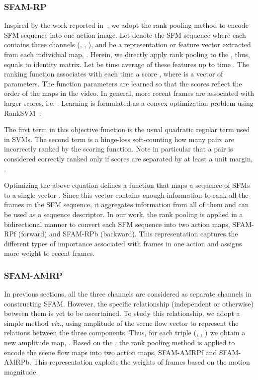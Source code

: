 \documentclass[10pt,twocolumn,letterpaper]{article}
\begin{document}
\subsubsection{SFAM-RP}
Inspired by the work reported in~\cite{bilen2016dynamic}, we adopt the rank 
pooling method to encode SFM sequence into one action image. Let 
 denote the SFM sequence where each  contains three 
channels (, , ), and  be a representation or feature vector extracted from each 
individual map, . Herein, we directly apply rank pooling to the , 
thus,  equals to identity matrix.  Let  be time average of these 
features up to time . The ranking function associates with each time  a 
score , where  is a vector of parameters. The function parameters  
are learned so that the scores reflect the order of the maps in the video. In 
general, more recent frames are associated with larger scores, i.e. . Learning  is 
formulated as a convex optimization problem using 
RankSVM~\cite{smola2004tutorial}:



The first term in this objective function is the usual quadratic regular term 
used in SVMs. 
The second term is a hinge-loss soft-counting how many pairs  are 
incorrectly ranked by the scoring function. Note in particular that a pair is 
considered correctly ranked only if scores are separated by at least a unit 
margin, . 

Optimizing the above equation defines a function  
that maps a sequence of  SFMs to a single vector . Since 
this vector contains enough information to rank all the frames in the SFM 
sequence, it aggregates information from all of them and can be used as a 
sequence descriptor.  In our work, the rank pooling is applied in a bidirectional 
manner to convert each SFM sequence into two action maps, SFAM-RPf (forward) 
and SFAM-RPb (backward). This representation captures the different 
types of importance associated with frames in one action and assigns more 
weight to recent frames. 

\subsubsection{SFAM-AMRP}

In previous sections, all the three channels are considered as separate 
channels in constructing SFAM. However, the specific relationship (independent 
or otherwise) between them is yet to be ascertained. To study this 
relationship, we adopt a simple method \textit{viz.}, using amplitude of the 
scene flow vector  to represent the relations between the three 
components. Thus, for each triple (, , ) we 
obtain a new amplitude map, . Based on the , the rank pooling method is applied to 
encode the scene flow maps into two action maps, SFAM-AMRPf and SFAM-AMRPb. This 
representation exploits the weights of frames based on the motion magnitude.
\end{document}
